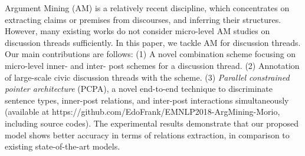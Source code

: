 Argument Mining (AM) is a relatively recent discipline, which concentrates on extracting claims or premises from discourses, and inferring their structures. However, many existing works do not consider micro-level AM studies on discussion threads sufficiently. In this paper, we tackle AM for discussion threads. Our main contributions are follows: (1) A novel combination scheme focusing on micro-level inner- and inter- post schemes for a discussion thread. (2) Annotation of large-scale civic discussion threads with the scheme. (3) {\it Parallel constrained pointer architecture} (PCPA), a novel end-to-end technique to discriminate sentence types, inner-post relations, and inter-post interactions simultaneously (available at https://github.com/EdoFrank/EMNLP2018-ArgMining-Morio, including source codes). The experimental results demonstrate that our proposed model shows better accuracy in terms of relations extraction, in comparison to existing state-of-the-art models.
